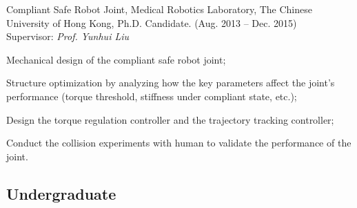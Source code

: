 \documentclass[10pt,letterpaper]{article}
\renewenvironment{itemize}{
\begin{list}{}{
    \setlength{\leftmargin}{1.5em}
    \setlength{\itemsep}{0.25em}
    \setlength{\parskip}{0pt}
    \setlength{\parsep}{0.25em}
    }
    }{
\end{list}
}
\begin{document}
\begin{itemize}
    \item Compliant Safe Robot Joint, Medical Robotics Laboratory, The Chinese University of Hong Kong, Ph.D. Candidate. (Aug. 2013 -- Dec. 2015) \\
    Supervisor: \textit{Prof. Yunhui Liu}
    \begin{itemize}
        \item Mechanical design of the compliant safe robot joint;
        \item Structure optimization by analyzing how the key parameters affect the joint's performance (torque threshold, stiffness under compliant state, etc.);
        \item Design the torque regulation controller and the trajectory tracking controller;
        \item Conduct the collision experiments with human to validate the performance of the joint.
    \end{itemize}
\end{itemize}

\subsection*{Undergraduate}
\end{document}
